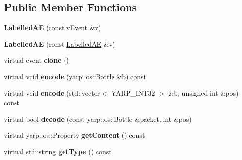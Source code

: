 \subsection*{Public Member Functions}
\begin{DoxyCompactItemize}
\item 
{\bfseries Labelled\+AE} (const \hyperlink{classev_1_1vEvent}{v\+Event} \&v)\hypertarget{classev_1_1LabelledAE_ad9d765e87dbd81bddf3b58b7ba0f1b8a}{}\label{classev_1_1LabelledAE_ad9d765e87dbd81bddf3b58b7ba0f1b8a}

\item 
{\bfseries Labelled\+AE} (const \hyperlink{classev_1_1LabelledAE}{Labelled\+AE} \&v)\hypertarget{classev_1_1LabelledAE_aeca0ead752908e7c7f22aeb69b4f7e3a}{}\label{classev_1_1LabelledAE_aeca0ead752908e7c7f22aeb69b4f7e3a}

\item 
virtual event {\bfseries clone} ()\hypertarget{classev_1_1LabelledAE_aad6de4f38547d2b586c333de1c247ccf}{}\label{classev_1_1LabelledAE_aad6de4f38547d2b586c333de1c247ccf}

\item 
virtual void {\bfseries encode} (yarp\+::os\+::\+Bottle \&b) const \hypertarget{classev_1_1LabelledAE_a8e6ad790b6c44ca7482a073f594c1bf7}{}\label{classev_1_1LabelledAE_a8e6ad790b6c44ca7482a073f594c1bf7}

\item 
virtual void {\bfseries encode} (std\+::vector$<$ Y\+A\+R\+P\+\_\+\+I\+N\+T32 $>$ \&b, unsigned int \&pos) const \hypertarget{classev_1_1LabelledAE_ad816e6e4449d6cbd23582948ea40a22e}{}\label{classev_1_1LabelledAE_ad816e6e4449d6cbd23582948ea40a22e}

\item 
virtual bool {\bfseries decode} (const yarp\+::os\+::\+Bottle \&packet, int \&pos)\hypertarget{classev_1_1LabelledAE_a77cdc54c31f7998368a17277d2d6662a}{}\label{classev_1_1LabelledAE_a77cdc54c31f7998368a17277d2d6662a}

\item 
virtual yarp\+::os\+::\+Property {\bfseries get\+Content} () const \hypertarget{classev_1_1LabelledAE_acaf1c5db1cd5c1e639a151abd36ff57e}{}\label{classev_1_1LabelledAE_acaf1c5db1cd5c1e639a151abd36ff57e}

\item 
virtual std\+::string {\bfseries get\+Type} () const \hypertarget{classev_1_1LabelledAE_a331be65fc4ecb022ede92b02bff91ec6}{}\label{classev_1_1LabelledAE_a331be65fc4ecb022ede92b02bff91ec6}

\end{DoxyCompactItemize}
